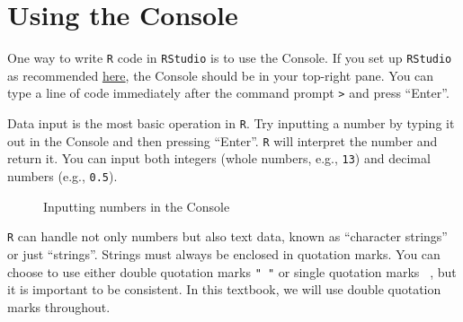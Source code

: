 \documentclass[
  letterpaper,
  DIV=11,
  numbers=noendperiod]{scrreprt}
\begin{document}
\section{Using the Console}\label{using-the-console}

One way to write \texttt{R} code in \texttt{RStudio} is to use the
Console. If you set up \texttt{RStudio} as recommended
\href{https://elenlefoll.github.io/RstatsTextbook/InstallingR.html\#global-options}{here},
the Console should be in your top-right pane. You can type a line of
code immediately after the command prompt \texttt{\textgreater{}} and
press ``Enter''.

Data input is the most basic operation in \texttt{R}. Try inputting a
number by typing it out in the Console and then pressing ``Enter''.
\texttt{R} will interpret the number and return it. You can input both
integers (whole numbers, e.g., \texttt{13}) and decimal numbers (e.g.,
\texttt{0.5}).

\begin{figure}


\caption{\label{fig-ConsoleInputNumbers}Inputting numbers in the
Console}

\end{figure}%

\texttt{R} can handle not only numbers but also text data, known as
``character strings'' or just ``strings''. Strings must always be
enclosed in quotation marks. You can choose to use either double
quotation marks \texttt{"\ "} or single quotation marks
\texttt{\textquotesingle{}\ \textquotesingle{}}, but it is important to
be consistent. In this textbook, we will use double quotation marks
throughout.
\end{document}
